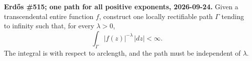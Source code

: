 \textbf{Erd\H{o}s \#515; one path for all positive exponents, 2026-09-24.}
Given a transcendental entire function $f$, construct one locally rectifiable path $\Gamma$ tending to infinity such that, for every $\lambda>0$,
\[
 \int_\Gamma |f(z)|^{-\lambda}\,|dz|<\infty.
\]
The integral is with respect to arclength, and the path must be independent of $\lambda$.
